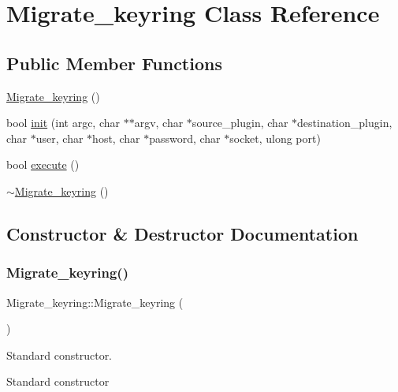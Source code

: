 \hypertarget{classMigrate__keyring}{}\section{Migrate\+\_\+keyring Class Reference}
\label{classMigrate__keyring}
\subsection*{Public Member Functions}
\begin{DoxyCompactItemize}
\item 
\mbox{\hyperlink{classMigrate__keyring_a9a6479fd21c4bf412773951cfa47ac53}{Migrate\+\_\+keyring}} ()
\item 
bool \mbox{\hyperlink{classMigrate__keyring_ad9053c75711365701f3462e85165053b}{init}} (int argc, char $\ast$$\ast$argv, char $\ast$source\+\_\+plugin, char $\ast$destination\+\_\+plugin, char $\ast$user, char $\ast$host, char $\ast$password, char $\ast$socket, ulong port)
\item 
bool \mbox{\hyperlink{classMigrate__keyring_aed008849efeecefdebeee6047d54ff54}{execute}} ()
\item 
\mbox{\hyperlink{classMigrate__keyring_a72feb62bf75af75fb767e5ff3e320bbd}{$\sim$\+Migrate\+\_\+keyring}} ()
\end{DoxyCompactItemize}


\subsection{Constructor \& Destructor Documentation}
\mbox{\label{classMigrate__keyring_a9a6479fd21c4bf412773951cfa47ac53}} 
\subsubsection{\texorpdfstring{Migrate\+\_\+keyring()}{Migrate\_keyring()}}
{\footnotesize\ttfamily Migrate\+\_\+keyring\+::\+Migrate\+\_\+keyring (\begin{DoxyParamCaption}{ }\end{DoxyParamCaption})}

Standard constructor.

Standard constructor \mbox{\label{classMigrate__keyring_a72feb62bf75af75fb767e5ff3e320bbd}} 
